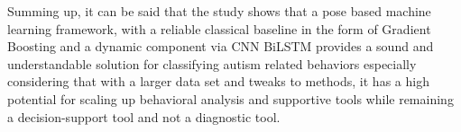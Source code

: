 Summing up, it can be said that the study shows that a pose based machine learning framework, with a reliable classical baseline in the form of Gradient Boosting and a dynamic component via CNN BiLSTM provides a sound and understandable solution for classifying autism related behaviors especially considering that with a larger data set and tweaks to methods, it has a high potential for scaling up behavioral analysis and supportive tools while remaining a decision-support tool and not a diagnostic tool.

